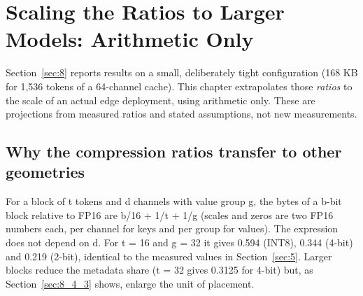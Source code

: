 \documentclass[12pt,a4paper]{report}
\begin{document}
\section{Scaling the Ratios to Larger Models: Arithmetic Only}\label{sec:13}
Section~\ref{sec:8} reports results on a small, deliberately tight configuration (168 KB for 1,536 tokens of a 64-channel cache). This chapter extrapolates those \textit{ratios} to the scale of an actual edge deployment, using arithmetic only. These are projections from measured ratios and stated assumptions, not new measurements.

\subsection{Why the compression ratios transfer to other geometries}\label{sec:13_1}
For a block of t tokens and d channels with value group g, the bytes of a b-bit block relative to FP16 are b/16 + 1/t + 1/g (scales and zeros are two FP16 numbers each, per channel for keys and per group for values). The expression does not depend on d. For t = 16 and g = 32 it gives 0.594 (INT8), 0.344 (4-bit) and 0.219 (2-bit), identical to the measured values in Section~\ref{sec:5}. Larger blocks reduce the metadata share (t = 32 gives 0.3125 for 4-bit) but, as Section~\ref{sec:8_4_3} shows, enlarge the unit of placement.
\end{document}
